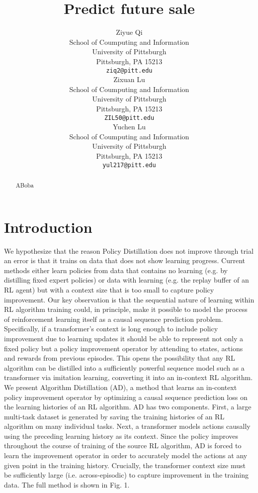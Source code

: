 \documentclass{article}
\title{Predict future sale}
\author{
 Ziyue Qi \\
  School of Coumputing and Information\\
  University of Pittsburgh\\
  Pittsburgh, PA 15213 \\
  \texttt{ziq2@pitt.edu} \\
   \And
 Zixuan Lu \\
  School of Coumputing and Information\\
  University of Pittsburgh\\
  Pittsburgh, PA 15213 \\
  \texttt{ZIL50@pitt.edu} \\
  \And
 Yuchen Lu \\
  School of Coumputing and Information\\
  University of Pittsburgh\\
  Pittsburgh, PA 15213 \\
  \texttt{yul217@pitt.edu} \\
}
\begin{document}
\maketitle
\begin{abstract}
ABoba
\end{abstract}



\section{Introduction}

We hypothesize that the reason Policy Distillation does not improve through trial an error is that it
trains on data that does not show learning progress. Current methods either learn policies from data
that contains no learning (e.g. by distilling fixed expert policies) or data with learning (e.g. the replay
buffer of an RL agent) but with a context size that is too small to capture policy improvement.
Our key observation is that the sequential nature of learning within RL algorithm training could,
in principle, make it possible to model the process of reinforcement learning itself as a causal
sequence prediction problem. Specifically, if a transformer’s context is long enough to include policy
improvement due to learning updates it should be able to represent not only a fixed policy but a policy
improvement operator by attending to states, actions and rewards from previous episodes. This opens
the possibility that any RL algorithm can be distilled into a sufficiently powerful sequence model
such as a transformer via imitation learning, converting it into an in-context RL algorithm.
We present Algorithm Distillation (AD), a method that learns an in-context policy improvement
operator by optimizing a causal sequence prediction loss on the learning histories of an RL algorithm.
AD has two components. First, a large multi-task dataset is generated by saving the training histories
of an RL algorithm on many individual tasks. Next, a transformer models actions causally using the
preceding learning history as its context. Since the policy improves throughout the course of training
of the source RL algorithm, AD is forced to learn the improvement operator in order to accurately
model the actions at any given point in the training history. Crucially, the transformer context size
must be sufficiently large (i.e. across-episodic) to capture improvement in the training data. The full
method is shown in Fig. 1.





\begin{thebibliography}{1}


\end{thebibliography}
\end{document}
